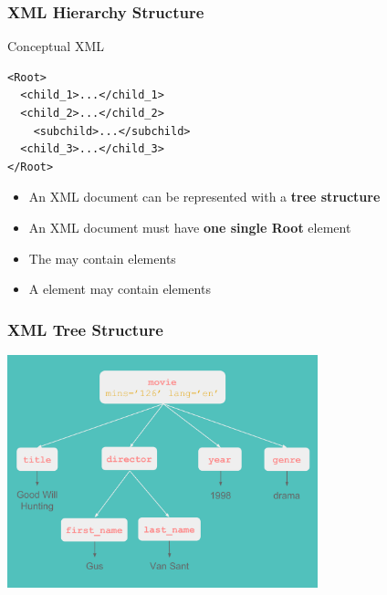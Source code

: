 \documentclass{beamer}\usepackage[]{graphicx}\usepackage[]{color}
\begin{document}
\begin{frame}[fragile]
\frametitle{XML Hierarchy Structure}

\begin{block}{Conceptual XML}
\begin{verbatim}
<Root>
  <child_1>...</child_1>
  <child_2>...</child_2>
    <subchild>...</subchild>
  <child_3>...</child_3>
</Root>
\end{verbatim}
\end{block}

\bigskip

\begin{itemize}
 \item An XML document can be represented with a \textbf{tree structure}
 \item An XML document must have \textbf{one single Root} element
 \item The  may contain  elements
 \item A  element may contain  elements
\end{itemize}

\end{frame}


\begin{frame}
\frametitle{XML Tree Structure}

\begin{center}
\includegraphics[width=9cm]{images/xml_movie_tree1.pdf}
\end{center}

\end{frame}

\end{document}
